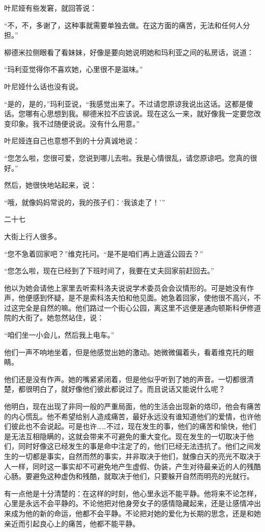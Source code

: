 叶尼娅有些发窘，就回答说：

“不，不，多谢了，这种事就需要单独去做。在这方面的痛苦，无法和任何人分担。”

柳德米拉侧眼看了看妹妹，好像是要向她说明她和玛利亚之间的私房话，说道：

“玛利亚觉得你不喜欢她，心里很不是滋味。”

叶尼娅什么话也没有说。

“是的，是的，”玛利亚说，“我感觉出来了。不过请您原谅我说出这话。这都是傻话。您哪有心思想到我。柳德米拉不应该说。现在这么一来，就好像我一定要您改变印象。我不过随便说说。没有什么用意。”

叶尼娅连自己也意想不到的十分真诚地说：

“您怎么啦，您很可爱，您说到哪儿去啦。我是心情很乱，请您原谅吧。您真的很好。”

然后，她很快地站起来，说：

“哦，就像妈妈常说的，我的孩子们：‘我该走了！’”

二十七

大街上行人很多。

“您不急着回家吧？”维克托问。“是不是咱们再上逍遥公园去？”

“您怎么啦，现在已经到了下班时间了，我要在丈夫回家前赶回去。”

他以为她会请他上家里去听索科洛夫说说学术委员会会议情形的。可是她没有作声，他便感到怀疑，是不是索科洛夫怕和他见面。她急着回家，使他很不高兴，不过这完全是自然的嘛。他们路过一个街心公园，离这里不远便是通向顿斯科伊修道院的大街了。她忽然站住，说：

“咱们坐一小会儿，然后我上电车。”

他们一声不响地坐着，但是他感觉出她的激动。她微微偏着头，看着维克托的眼睛。

他们还是没有作声。她的嘴紧紧闭着，但是他似乎听到了她的声音。一切都很清楚，都很明白了，就好像他们彼此都说过了。而且说话又能说什么呢？

他明白，现在出现了非同一般的严重局面，他的生活会出现新的烙印，他会有痛苦的内心慌乱。他不希望给别人造成痛苦，最好永远没有谁知道他们的爱情，也许他们彼此也不会说起。可是也许……不过，现在发生的事，他们的痛苦和愉快，他们是无法互相隐瞒的，这就会带来不可避免的重大变化。现在发生的一切取决于他们，同时好像这已经发生的事是命中注定了的，他们已经无法违抗了。他们之间发生的一切都是事实，自然而然的事实，并非取决于他们，就像白天的亮光不取决于人一样，同时这一事实却不可避免地产生虚假、伪装，产生对待最亲近的人的残酷心肠。要避免这种虚伪和残酷，就取决于他们，只要躲开自然而明亮的光就行。

有一点他是十分清楚的：在这样的时刻，他心里永远不能平静。他将来不论怎样，心里是永远不会平静的。不论他把对他身旁女子的感情隐藏起来，还是让感情冲出来成为他的新的命运，他都不会平静。不论把对她的爱化为长期的思念，还是和她亲近而引起良心上的痛苦，他都不能平静。

